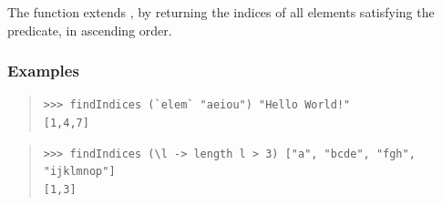 \begin{haddockdesc}
\item[\begin{tabular}{@{}l}
findIndices :: (a -> Bool) -> {\char 91}a{\char 93} -> {\char 91}Int{\char 93}
\end{tabular}]
{\haddockbegindoc
The  function extends , by returning the
 indices of all elements satisfying the predicate, in ascending order.\par
\subsubsection*{\textbf{Examples}}
\begin{quote}
{\haddockverb\begin{verbatim}
>>> findIndices (`elem` "aeiou") "Hello World!"
[1,4,7]

\end{verbatim}}
\end{quote}
\begin{quote}
{\haddockverb\begin{verbatim}
>>> findIndices (\l -> length l > 3) ["a", "bcde", "fgh", "ijklmnop"]
[1,3]

\end{verbatim}}
\end{quote}}
\end{haddockdesc}
